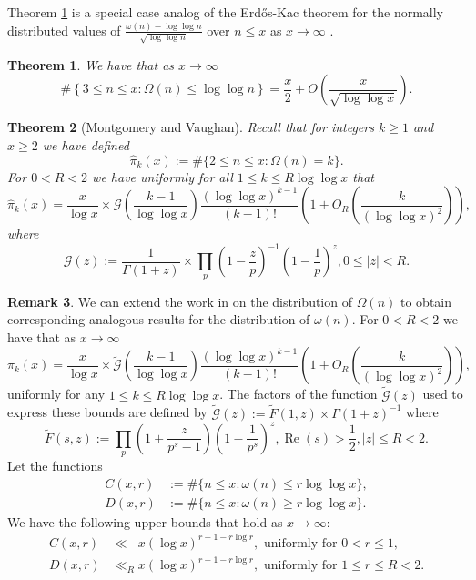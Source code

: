\documentclass[11pt,reqno,a4letter]{article}
\newcommand{\hlocalref}[1]{\hyperref[#1]{\ref{#1}}}
\numberwithin{equation}{section}
\numberwithin{figure}{section}
\numberwithin{table}{section}
\newcommand{\cf}{\textit{cf.\ }}
\theoremstyle{plain}
\newtheorem{theorem}{Theorem}
\numberwithin{theorem}{section}
\theoremstyle{definition}
\newtheorem{remark}[theorem]{Remark}
\renewcommand{\Re}{\operatorname{Re}}
\begin{document}
Theorem \hlocalref{theorem_MV_Thm7.21-init_stmt} is a special case analog of the 
Erd\H{o}s-Kac theorem for the normally distributed values of 
$\frac{\omega(n) - \log\log n}{\sqrt{\log\log n}}$ over $n \leq x$ as 
$x \rightarrow \infty$ \cite[\cf Thm.\ 7.21]{MV} \cite[\cf \S 1.7]{IWANIEC-KOWALSKI}. 

\begin{theorem}
\label{theorem_MV_Thm7.21-init_stmt} 
We have that as $x \rightarrow \infty$ 
\[
\#\left\{3 \leq n \leq x: \Omega(n) \leq \log\log n \right\} = 
     \frac{x}{2} + O\left(\frac{x}{\sqrt{\log\log x}}\right). 
\]
\end{theorem} 

\begin{theorem}[Montgomery and Vaughan]
\label{theorem_HatPi_ExtInTermsOfGz} 
Recall that for integers $k \geq 1$ and $x \geq 2$ we have defined 
$$\widehat{\pi}_k(x) := \#\{2 \leq n \leq x: \Omega(n)=k\}.$$ 
For $0 < R < 2$ we have uniformly for all $1 \leq k \leq R \log\log x$ that 
\[
\widehat{\pi}_k(x) = \frac{x}{\log x} \times \mathcal{G}\left(\frac{k-1}{\log\log x}\right) 
     \frac{(\log\log x)^{k-1}}{(k-1)!} \left(1 + O_R\left(\frac{k}{(\log\log x)^2}\right)\right), 
\]
where 
\[
\mathcal{G}(z) := \frac{1}{\Gamma(1+z)} \times 
     \prod_p \left(1-\frac{z}{p}\right)^{-1} \left(1-\frac{1}{p}\right)^z, 0 \leq |z| < R. 
\]
\end{theorem} 

\begin{remark} 
\label{remark_MV_Pikx_FuncResultsAnnotated_v1} 
We can extend the work in \cite{MV} on the distribution of $\Omega(n)$ to obtain 
corresponding analogous results for the distribution of $\omega(n)$. 
For $0 < R < 2$ we have that as $x \rightarrow \infty$ 
\begin{equation}
\label{eqn_Pikx_UniformAsymptoticsStmt_from_MV_v2} 
\pi_k(x) = \frac{x}{\log x} \times 
     \widetilde{\mathcal{G}}\left(\frac{k-1}{\log\log x}\right) 
     \frac{(\log\log x)^{k-1}}{(k-1)!} \left( 
     1 + O_R\left(\frac{k}{(\log\log x)^2}\right) 
     \right), 
\end{equation}
uniformly for any $1 \leq k \leq R\log\log x$. 
The factors of the function $\widetilde{\mathcal{G}}(z)$ used to express these bounds are 
defined by $\widetilde{\mathcal{G}}(z) := \widetilde{F}(1, z) \times \Gamma(1+z)^{-1}$ where 
\[
\widetilde{F}(s, z) := \prod_p \left(1 + \frac{z}{p^s-1}\right) \left(1 - \frac{1}{p^s}\right)^{z}, 
     \Re(s) > \frac{1}{2}, |z| \leq R < 2. 
\]
Let the functions 
\begin{align*} 
C(x, r) & := \#\{n \leq x: \omega(n) \leq r \log\log x\}, \\ 
D(x, r) & := \#\{n \leq x: \omega(n) \geq r \log\log x\}. 
\end{align*} 
We have the following upper bounds that hold as $x \rightarrow \infty$: 
\begin{align*} 
C(x, r) & \ll\phantom{_R} x (\log x)^{r - 1 - r \log r}, \text{ uniformly for } 0 < r \leq 1, \\ 
D(x, r) & \ll_R x (\log x)^{r - 1 - r \log r}, \text{ uniformly for } 1 \leq r \leq R < 2.
\end{align*} 
\end{remark} 
\end{document}
